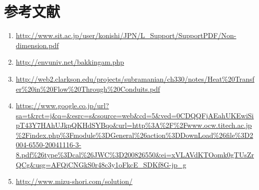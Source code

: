 \documentclass[a4j,twoside,openright,11pt]{jarticle}
\begin{document}
\section{参考文献}
\begin{enumerate}
\item \url{http://www.sit.ac.jp/user/konishi/JPN/L_Support/SupportPDF/Non-dimension.pdf}
\item \url{http://envuniv.net/bakkingam.php}
\item \url{http://web2.clarkson.edu/projects/subramanian/ch330/notes/Heat%20Transfer%20in%20Flow%20Through%20Conduits.pdf}
\item \url{https://www.google.co.jp/url?sa=t&rct=j&q=&esrc=s&source=web&cd=5&ved=0CDQQFjAEahUKEwiSipT43Y7HAhUJkpQKHdSYBqo&url=http%3A%2F%2Fwww.ocw.titech.ac.jp%2Findex.php%3Fmodule%3DGeneral%26action%3DDownLoad%26file%3D2004-6550-20041116-3-8.pdf%26type%3Dcal%26JWC%3D200826550&ei=xVLAVdKTOomk0gTUsZrQCg&usg=AFQjCNGkS0r48c3y1oFkcE_SDKf8G-jp_g}
\item \url{http://www.mizu-shori.com/solution/}
\end{enumerate}
\end{document}
